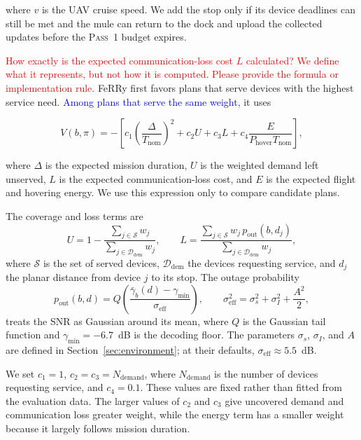\documentclass[conference]{IEEEtran}
\begin{document}
where $v$ is the UAV cruise speed. We add the stop only if its device deadlines
can still be met and the mule can return to the dock and upload the collected
updates before the \textsc{Pass~1} budget expires.

\textcolor{red}{How exactly is the expected communication-loss cost \(L\) calculated? We define what it represents, but not how it is computed. Please provide the formula or implementation rule.}
FeRRy first favors plans that serve devices with the highest service need.
\textcolor{blue}{Among plans that serve the same weight,} it uses

\begin{equation}
V(b,\pi)
=
-
\left[
c_1\left(\frac{\Delta}{T_{\mathrm{nom}}}\right)^2
+
c_2 U
+
c_3 L
+
c_4\frac{E}{P_{\mathrm{hover}}T_{\mathrm{nom}}}
\right],
\label{eq:mission-score}
\end{equation}

where $\Delta$ is the expected mission duration, $U$ is the weighted demand left
unserved, $L$ is the expected communication-loss cost, and $E$ is the expected
flight and hovering energy. We use this expression only to compare candidate
plans.

{\color{blue}
The coverage and loss terms are
\begin{equation}
U=1-\frac{\sum_{j\in\mathcal{S}}w_j}{\sum_{j\in\mathcal{D}_{\mathrm{dem}}}w_j},
\qquad
L=\frac{\sum_{j\in\mathcal{S}}w_j\,p_{\mathrm{out}}(b,d_j)}
       {\sum_{j\in\mathcal{D}_{\mathrm{dem}}}w_j},
\label{eq:coverage-loss}
\end{equation}
where $\mathcal{S}$ is the set of served devices, $\mathcal{D}_{\mathrm{dem}}$ the
devices requesting service, and $d_j$ the planar distance from device $j$ to its
stop. The outage probability
\begin{equation}
p_{\mathrm{out}}(b,d)=
Q\!\left(\frac{\bar{\gamma}_b(d)-\gamma_{\min}}{\sigma_{\mathrm{eff}}}\right),
\qquad
\sigma_{\mathrm{eff}}^2=\sigma_s^2+\sigma_I^2+\frac{A^2}{2},
\label{eq:outage}
\end{equation}
treats the SNR as Gaussian around its mean, where $Q$ is the Gaussian tail
function and $\gamma_{\min}=-6.7$~dB is the decoding floor. The parameters
$\sigma_s$, $\sigma_I$, and $A$ are defined in Section~\ref{sec:environment}; at
their defaults, $\sigma_{\mathrm{eff}}\approx5.5$~dB.\par}

We set $c_1=1$, $c_2=c_3=N_{\mathrm{demand}}$, where
$N_{\mathrm{demand}}$ is the number of devices requesting service, and
$c_4=0.1$. These values are fixed rather than fitted from the evaluation data.
The larger values of $c_2$ and $c_3$ give uncovered demand and communication
loss greater weight, while the energy term has a smaller weight because it
largely follows mission duration.
\end{document}
